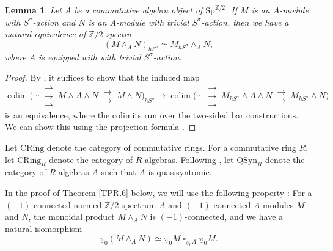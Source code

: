 \documentclass[10pt]{amsart}
\newtheorem{lem}[thm]{Lemma}
\theoremstyle{definition}
\numberwithin{equation}{section}
\newcommand{\Z}{\mathbb{Z}}
\newcommand{\ul}{\underline}
\newcommand{\CRing}{\mathrm{CRing}}
\newcommand{\Sp}{\mathrm{Sp}}
\newcommand{\colim}{\mathop{\mathrm{colim}}}
\DeclareMathOperator{\sotimes}{\square}
\newcommand{\QSyn}{\mathrm{QSyn}}
\begin{document}
{\begin{lem}
\label{descent.1}
Let $A$ be a commutative algebra object of $\Sp^{\Z/2}$.
If $M$ is an $A$-module with $S^\sigma$-action and $N$ is an $A$-module with trivial $S^\sigma$-action,
then we have a natural equivalence of $\Z/2$-spectra
\[
(M\wedge_A N)_{hS^\sigma}\simeq M_{hS^\sigma} \wedge_A N,
\]
where $A$ is equipped with with trivial $S^\sigma$-action.
\end{lem}
\begin{proof}
By \cite[\S 4.4.1, Theorem 4.5.2.1(2)]{HA},
it suffices to show that the induced map
\[
\colim
\big(
\cdots
\,
\substack{\rightarrow\\[-1em] \rightarrow \\[-1em] \rightarrow}
\,
M\wedge A\wedge N
\,
\substack{\rightarrow\\[-1em] \rightarrow}
\,
M\wedge N
\big)_{hS^\sigma}
\to
\colim
\big(
\cdots
\,
\substack{\rightarrow\\[-1em] \rightarrow \\[-1em] \rightarrow}
\,
M_{hS^\sigma}\wedge A\wedge N
\,
\substack{\rightarrow\\[-1em] \rightarrow}
\,
M_{hS^\sigma}\wedge N
\big)
\]
is an equivalence,
where the colimits run over the two-sided bar constructions.
We can show this using the projection formula \cite[Example 5.19, Lemma 5.45]{QS21}.
\end{proof}

Let $\CRing$ denote the category of commutative rings.
For a commutative ring $R$,
let $\CRing_R$ denote the category of $R$-algebras.
Following \cite[Variant 4.33]{BMS19},
let $\QSyn_R$ denote the category of $R$-algebras $A$ such that $A$ is quasisyntomic.

In the proof of Theorem \ref{TPR.6} below,
we will use the following property \cite[Corollary 6.8.1]{BGS20}:
For a $(-1)$-connected normed $\Z/2$-spectrum $A$ and $(-1)$-connected $A$-modules $M$ and $N$,
the monoidal product $M\wedge_A N$ is $(-1)$-connected,
and we have a natural isomorphism
\[
\ul{\pi}_0(M\wedge_A N)
\simeq
\ul{\pi}_0 M \sotimes_{\ul{\pi}_0 A}\ul{\pi}_0 M.
\]

}
\end{document}
